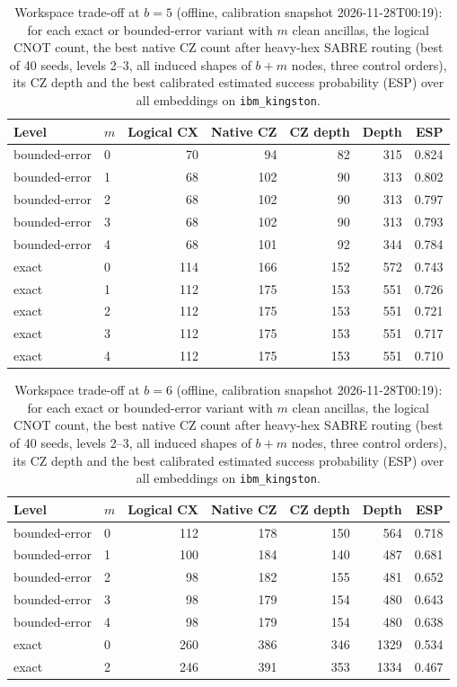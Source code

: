 \begin{table}[htbp]\centering\small
\caption{Workspace trade-off at $b=5$ (offline, calibration snapshot 2026-11-28T00:19): for each exact or bounded-error variant with $m$ clean ancillas, the logical CNOT count, the best native CZ count after heavy-hex SABRE routing (best of 40 seeds, levels 2--3, all induced shapes of $b+m$ nodes, three control orders), its CZ depth and the best calibrated estimated success probability (ESP) over all embeddings on \texttt{ibm\_kingston}.}\label{tab:q3-ws-b5}
\begin{tabular}{llrrrrr}\toprule Level & $m$ & Logical CX & Native CZ & CZ depth & Depth & ESP\\\midrule
bounded-error & 0 & 70 & 94 & 82 & 315 & 0.824\\
bounded-error & 1 & 68 & 102 & 90 & 313 & 0.802\\
bounded-error & 2 & 68 & 102 & 90 & 313 & 0.797\\
bounded-error & 3 & 68 & 102 & 90 & 313 & 0.793\\
bounded-error & 4 & 68 & 101 & 92 & 344 & 0.784\\
\midrule
exact & 0 & 114 & 166 & 152 & 572 & 0.743\\
exact & 1 & 112 & 175 & 153 & 551 & 0.726\\
exact & 2 & 112 & 175 & 153 & 551 & 0.721\\
exact & 3 & 112 & 175 & 153 & 551 & 0.717\\
exact & 4 & 112 & 175 & 153 & 551 & 0.710\\
\bottomrule\end{tabular}\end{table}

\begin{table}[htbp]\centering\small
\caption{Workspace trade-off at $b=6$ (offline, calibration snapshot 2026-11-28T00:19): for each exact or bounded-error variant with $m$ clean ancillas, the logical CNOT count, the best native CZ count after heavy-hex SABRE routing (best of 40 seeds, levels 2--3, all induced shapes of $b+m$ nodes, three control orders), its CZ depth and the best calibrated estimated success probability (ESP) over all embeddings on \texttt{ibm\_kingston}.}\label{tab:q3-ws-b6}
\begin{tabular}{llrrrrr}\toprule Level & $m$ & Logical CX & Native CZ & CZ depth & Depth & ESP\\\midrule
bounded-error & 0 & 112 & 178 & 150 & 564 & 0.718\\
bounded-error & 1 & 100 & 184 & 140 & 487 & 0.681\\
bounded-error & 2 & 98 & 182 & 155 & 481 & 0.652\\
bounded-error & 3 & 98 & 179 & 154 & 480 & 0.643\\
bounded-error & 4 & 98 & 179 & 154 & 480 & 0.638\\
\midrule
exact & 0 & 260 & 386 & 346 & 1329 & 0.534\\
exact & 2 & 246 & 391 & 353 & 1334 & 0.467\\
\bottomrule\end{tabular}\end{table}

